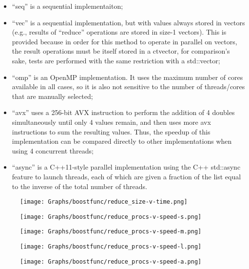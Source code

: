 \begin{itemize}
 \item ``seq'' is a sequential implementaiton;
 \item ``vec'' is a sequential implementation, but with values always stored in
 vectors (e.g., results of ``reduce'' operations are stored in size-1 vectors).
 This is provided because in order for this method to operate in parallel on
 vectors, the result operations must be itself stored in a ctvector, for
 comparison's sake, tests are performed with the same restriction with a
 std::vector;
 \item ``omp'' is an OpenMP implementation. It uses the maximum number of cores
 available in all cases, so it is also not sensitive to the number of
 threads/cores that are manually selected;
 \item ``avx'' uses a 256-bit AVX instruction to perform the addition of 4 doubles
 simultaneously until only 4 values remain, and then uses more avx instructions
 to sum the resulting values. Thus, the speedup of this implementation can be
 compared directly to other implementations when using 4 concurrent threads;
 \item ``async'' is a C++11-style parallel implementation using the C++ std::async
 feature to launch threads, each of which are given a fraction of the list equal
 to the inverse of the total number of threads.
\end{itemize}

\begin{figure}[!h]
\centering
    \texttt{[image: Graphs/boostfunc/reduce\_size-v-time.png]}
\end{figure}
\begin{figure}[!h]
\centering
    \texttt{[image: Graphs/boostfunc/reduce\_procs-v-speed-s.png]}
\end{figure}
\begin{figure}[!h]
\centering
    \texttt{[image: Graphs/boostfunc/reduce\_procs-v-speed-m.png]}
\end{figure}
\begin{figure}[!h]
\centering
    \texttt{[image: Graphs/boostfunc/reduce\_procs-v-speed-l.png]}
\end{figure}
\begin{figure}[!h]
\centering
    \texttt{[image: Graphs/boostfunc/reduce\_procs-v-speed-a.png]}
\end{figure}


